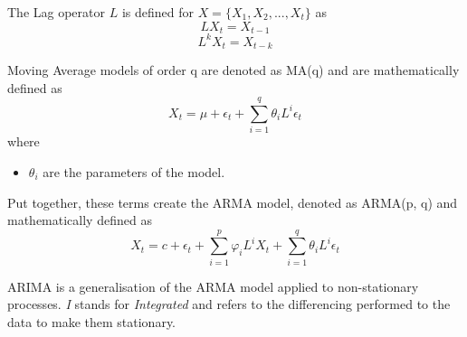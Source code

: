 The Lag operator $L$ is defined for $X = \{X_1, X_2,..., X_t\}$ as
\begin{equation}
    LX_t = X_{t-1}
\end{equation}
\begin{equation}
    L^kX_t = X_{t-k}
\end{equation}

Moving Average models of order q are denoted as MA(q) and are mathematically defined as 
\begin{equation}
    X_t = \mu + \epsilon_t + \sum\limits_{i=1}^{q} \theta_i L^i \epsilon_{t}
\end{equation}
where
\begin{itemize}[nosep]
    \item[] $\theta_i$ are the parameters of the model.
\end{itemize}

Put together, these terms create the ARMA model, denoted as ARMA(p, q) and mathematically defined as 
\begin{equation}
    X_t = c + \epsilon_t + \sum\limits_{i=1}^{p} \varphi_i L^i X_t + \sum\limits_{i=1}^{q} \theta_i L^i \epsilon_{t}
\end{equation}

ARIMA is a generalisation of the ARMA model applied to non-stationary processes. \textit{I} stands for \textit{Integrated} and refers to the differencing performed to the data to make them stationary.

